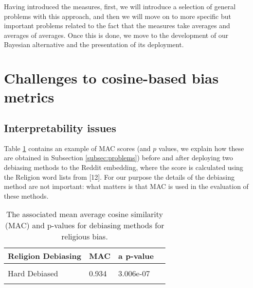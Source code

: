 \documentclass[
  12pt,
  dvipsnames,enabledeprecatedfontcommands]{scrartcl}
\begin{document}
Having introduced the measures, first, we will introduce a selection of
general problems with this approach, and then we will move on to more
specific but important problems related to the fact that the measures
take averages and averages of averages. Once this is done, we move to
the development of our Bayesian alternative and the presentation of its
deployment.

\hypertarget{challenges-to-cosine-based-bias-metrics}{%
\section{Challenges to cosine-based bias
metrics}\label{challenges-to-cosine-based-bias-metrics}}

\label{sec:challenges}

\hypertarget{interpretability-issues}{%
\subsection{Interpretability issues}\label{interpretability-issues}}

\label{subsec:interpretability}

Table \ref{tab:religionOriginal2} contains an example of \textsf{MAC}
scores (and \(p\) values, we explain how these are obtained in
Subsection \ref{subsec:problems}) before and after deploying two
debiasing methods to the Reddit embedding, where the score is calculated
using the Religion word lists from {[}12{]}. For our purpose the details
of the debiasing method are not important: what matters is that
\textsf{MAC} is used in the evaluation of these methods.

\begin{table}[H]
\footnotesize

\centering

\begin{tabular}[t]{lllr}
\toprule
Religion Debiasing & \textsf{MAC} & a p-value \\
\midrule
\cellcolor{gray!15}{Biased} & \cellcolor{gray!15}{0.859} & \cellcolor{gray!15}{N/A} \\
Hard Debiased & 0.934 & 3.006e-07\\
\cellcolor{gray!15}{Soft Debiased ($\lambda$ = 0.2)} & \cellcolor{gray!15}{0.894} & \cellcolor{gray!15}{0.007} \\
\bottomrule
\end{tabular}

\caption{The associated mean average cosine similarity
(\textsf{MAC}) and p-values for debiasing methods for religious bias.}
\label{tab:religionOriginal2}
\normalsize 
\end{table}
\end{document}
